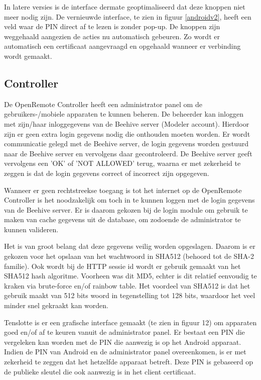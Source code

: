 \documentclass[]{article}
\begin{document}
In latere versies is de interface dermate geoptimaliseerd dat deze knoppen niet
meer nodig zijn. De vernieuwde interface, te zien in figuur \ref{androidv2}, heeft een
veld waar de PIN direct af te lezen is zonder pop-up. De knoppen zijn weggehaald
aangezien de acties nu automatisch gebeuren. Zo wordt er automatisch een
certificaat aangevraagd en opgehaald wanneer er verbinding wordt gemaakt. 

\subsection{Controller}
De OpenRemote Controller heeft een administrator panel om de gebruikers-/mobiele
apparaten te kunnen beheren. De beheerder kan inloggen met zijn/haar
inloggegevens van de Beehive server (Modeler account). Hierdoor zijn er geen
extra login gegevens nodig die onthouden moeten worden. Er wordt communicatie
gelegd met de Beehive server, de login gegevens worden gestuurd naar de Beehive server
en vervolgens daar gecontroleerd. De Beehive server geeft vervolgens een 'OK'
of 'NOT ALLOWED' terug, waarna er met zekerheid te zeggen is dat de login gegevens
correct of incorrect zijn opgegeven.

Wanneer er geen rechtstreekse toegang is tot het internet op de 
OpenRemote Controller is het noodzakelijk om toch in te kunnen loggen met de
login gegevens van de Beehive server. Er is daarom gekozen bij de login module
om gebruik te maken van cache gegevens uit de database, om zodoende de administrator te
kunnen valideren.

Het is van groot belang dat deze gegevens veilig worden opgeslagen. Daarom is er
gekozen voor het opslaan van het wachtwoord in SHA512 (behoord tot de SHA-2
familie). Ook wordt bij de HTTP sessie id  wordt er gebruik gemaakt van het SHA512
hash algoritme. Voorheen was dit MD5, echter is dit relatief
eenvoudig te kraken via brute-force en/of rainbow table. Het voordeel van SHA512
is dat het gebruik maakt van 512 bits woord in tegenstelling tot 128
bits, waardoor het veel minder snel gekraakt kan worden.

Tenslotte is er een grafische interface gemaakt (te zien in figuur 12) om
apparaten goed en/of af te keuren vanuit de administrator panel. Er bestaat
een PIN die vergeleken kan worden met de PIN die aanwezig is op het Android
apparaat. Indien de PIN van Android en de administrator panel overeenkomen, is
er met zekerheid te zeggen dat het hetzelfde apparaat betreft. Deze PIN is
gebaseerd op de publieke sleutel die ook aanwezig is in het client certificaat.
\end{document}
